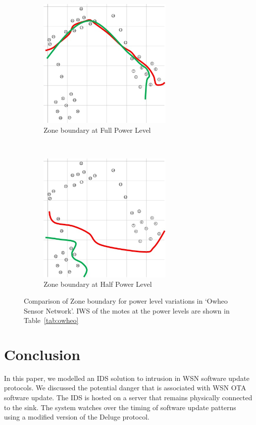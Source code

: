 \documentclass[conference]{IEEEtran}
\begin{document}
\begin{figure}[t!]
    \centering
    \begin{subfigure}[b]{0.4\textwidth}
        \centering
        \includegraphics[height=2.5in]{Owheo_full}
        \caption{Zone boundary at Full Power Level}
        \label{subfig:owheo_full}
    \end{subfigure}%
    ~ 
    \begin{subfigure}[b]{0.4\textwidth}
        \centering
        \includegraphics[height=2.5in]{Owheo_half}
        \caption{Zone boundary at Half Power Level}
        \label{subfig:owheo_half}
    \end{subfigure}
    \caption{Comparison of Zone boundary for power level variations in `Owheo Sensor Network'. IWS of the motes at the power levels are shown in Table~\ref{tab:owheo}}
\label{fig:owheo}
\end{figure}


\section{Conclusion}
\label{sec:concl}

In this paper, we modelled an IDS solution to intrusion in WSN software update protocols.
We discussed the potential danger that is associated with WSN OTA software update.
The IDS is hosted on a server that remains physically connected to the  sink. 
The system watches over the timing of software update patterns using a modified version of the Deluge protocol.
\end{document}
